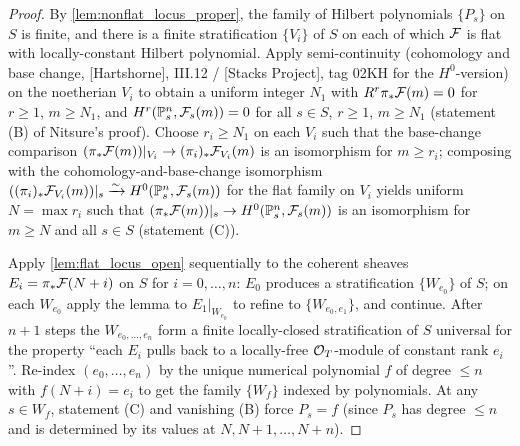 \begin{proof}
  By \cref{lem:nonflat_locus_proper}, the family of Hilbert polynomials
  \(\{P_s\}\) on \(S\) is finite, and there is a finite stratification
  \(\{V_i\}\) of \(S\) on each of which \(\mathcal{F}\) is flat with locally-constant
  Hilbert polynomial.  Apply semi-continuity (cohomology and base change,
  [Hartshorne], III.12 / [Stacks Project], tag 02KH for the \(H^0\)-version) on
  the noetherian \(V_i\) to obtain a uniform integer \(N_1\) with
  \(R^r \pi_* \mathcal{F}(m) = 0\) for \(r \ge 1\), \(m \ge N_1\), and \(H^r(\mathbb{P}^n_s, \mathcal{F}_s(m)) = 0\)
  for all \(s \in S\), \(r \ge 1\), \(m \ge N_1\) (statement (B) of Nitsure's proof).
  Choose \(r_i \ge N_1\) on each \(V_i\) such that the base-change comparison
  \((\pi_* \mathcal{F}(m))|_{V_i} \to (\pi_i)_* \mathcal{F}_{V_i}(m)\) is an isomorphism for
  \(m \ge r_i\); composing with the cohomology-and-base-change isomorphism
  \(((\pi_i)_* \mathcal{F}_{V_i}(m))|_s \xrightarrow{\sim} H^0(\mathbb{P}^n_s, \mathcal{F}_s(m))\) for
  the flat family on \(V_i\) yields uniform \(N = \max r_i\) such that
  \((\pi_* \mathcal{F}(m))|_s \to H^0(\mathbb{P}^n_s, \mathcal{F}_s(m))\) is an isomorphism for \(m \ge N\)
  and all \(s \in S\) (statement (C)).

  Apply \cref{lem:flat_locus_open} sequentially to the coherent sheaves
  \(E_i = \pi_* \mathcal{F}(N+i)\) on \(S\) for \(i = 0, \dots, n\): \(E_0\) produces a
  stratification \(\{W_{e_0}\}\) of \(S\); on each \(W_{e_0}\) apply the lemma to
  \(E_1|_{W_{e_0}}\) to refine to \(\{W_{e_0, e_1}\}\), and continue. After \(n+1\)
  steps the \(W_{e_0, \dots, e_n}\) form a finite locally-closed stratification
  of \(S\) universal for the property ``each \(E_i\) pulls back to a locally-free
  \(\mathcal{O}_T\)-module of constant rank \(e_i\)''.  Re-index \((e_0, \dots, e_n)\) by the
  unique numerical polynomial \(f\) of degree \(\le n\) with \(f(N+i) = e_i\) to get
  the family \(\{W_f\}\) indexed by polynomials.  At any \(s \in W_f\), statement
  (C) and vanishing (B) force \(P_s = f\) (since \(P_s\) has degree \(\le n\) and is
  determined by its values at \(N, N+1, \dots, N+n\)).


\end{proof}
